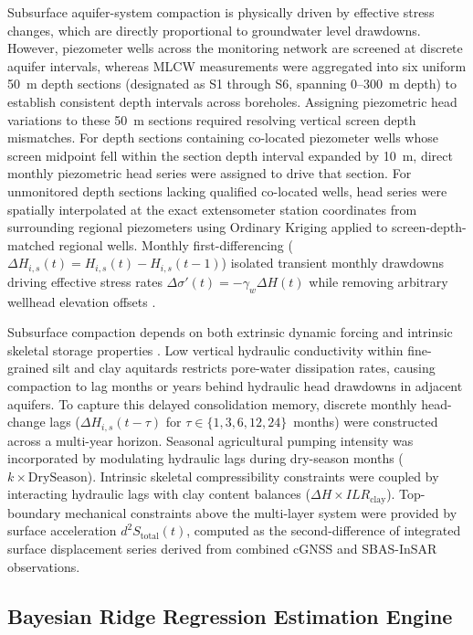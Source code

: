 Subsurface aquifer-system compaction is physically driven by effective stress changes, which are directly proportional to groundwater level drawdowns. However, piezometer wells across the monitoring network are screened at discrete aquifer intervals, whereas MLCW measurements were aggregated into six uniform 50~m depth sections (designated as S1 through S6, spanning 0--300~m depth) to establish consistent depth intervals across boreholes. Assigning piezometric head variations to these 50~m sections required resolving vertical screen depth mismatches. For depth sections containing co-located piezometer wells whose screen midpoint fell within the section depth interval expanded by 10~m, direct monthly piezometric head series were assigned to drive that section. For unmonitored depth sections lacking qualified co-located wells, head series were spatially interpolated at the exact extensometer station coordinates from surrounding regional piezometers using Ordinary Kriging applied to screen-depth-matched regional wells. Monthly first-differencing ($\Delta H_{i,s}(t) = H_{i,s}(t) - H_{i,s}(t-1)$) isolated transient monthly drawdowns driving effective stress rates $\Delta \sigma'(t) = -\gamma_w \Delta H(t)$ while removing arbitrary wellhead elevation offsets \citep{galloway_land_1999}.

Subsurface compaction depends on both extrinsic dynamic forcing and intrinsic skeletal storage properties \citep{liu_reconstructing_2023}. Low vertical hydraulic conductivity within fine-grained silt and clay aquitards restricts pore-water dissipation rates, causing compaction to lag months or years behind hydraulic head drawdowns in adjacent aquifers. To capture this delayed consolidation memory, discrete monthly head-change lags ($\Delta H_{i,s}(t - \tau)$ for $\tau \in \{1, 3, 6, 12, 24\}$~months) were constructed across a multi-year horizon. Seasonal agricultural pumping intensity was incorporated by modulating hydraulic lags during dry-season months ($k \times \text{DrySeason}$). Intrinsic skeletal compressibility constraints were coupled by interacting hydraulic lags with clay content balances ($\Delta H \times ILR_{\text{clay}}$). Top-boundary mechanical constraints above the multi-layer system were provided by surface acceleration $d^2S_{\text{total}}(t)$, computed as the second-difference of integrated surface displacement series derived from combined cGNSS and SBAS-InSAR observations.

\subsection{Bayesian Ridge Regression Estimation Engine}
\label{subsec:bayesian_ridge_engine}

